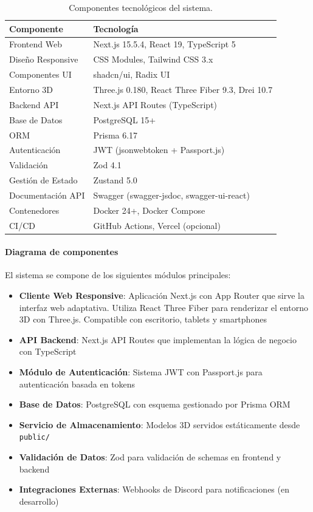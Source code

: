 \begin{table}[H]
	\centering
	\caption{Componentes tecnológicos del sistema.}
	\begin{tabular}{p{4cm} p{9cm}}
		\toprule
		Componente & Tecnología \\
		\midrule
		Frontend Web & Next.js 15.5.4, React 19, TypeScript 5 \\
		Diseño Responsive & CSS Modules, Tailwind CSS 3.x \\
		Componentes UI & shadcn/ui, Radix UI \\
		Entorno 3D & Three.js 0.180, React Three Fiber 9.3, Drei 10.7 \\
		Backend API & Next.js API Routes (TypeScript) \\
		Base de Datos & PostgreSQL 15+ \\
		ORM & Prisma 6.17 \\
		Autenticación & JWT (jsonwebtoken + Passport.js) \\
		Validación & Zod 4.1 \\
		Gestión de Estado & Zustand 5.0 \\
		Documentación API & Swagger (swagger-jsdoc, swagger-ui-react) \\
		Contenedores & Docker 24+, Docker Compose \\
		CI/CD & GitHub Actions, Vercel (opcional) \\
		\bottomrule
	\end{tabular}
\end{table}

\paragraph{Diagrama de componentes}

El sistema se compone de los siguientes módulos principales:

\begin{itemize}
	\item \textbf{Cliente Web Responsive}: Aplicación Next.js con App Router que sirve la interfaz web adaptativa. Utiliza React Three Fiber para renderizar el entorno 3D con Three.js. Compatible con escritorio, tablets y smartphones
	\item \textbf{API Backend}: Next.js API Routes que implementan la lógica de negocio con TypeScript
	\item \textbf{Módulo de Autenticación}: Sistema JWT con Passport.js para autenticación basada en tokens
	\item \textbf{Base de Datos}: PostgreSQL con esquema gestionado por Prisma ORM
	\item \textbf{Servicio de Almacenamiento}: Modelos 3D servidos estáticamente desde \texttt{public/}
	\item \textbf{Validación de Datos}: Zod para validación de schemas en frontend y backend
	\item \textbf{Integraciones Externas}: Webhooks de Discord para notificaciones (en desarrollo)
\end{itemize}

